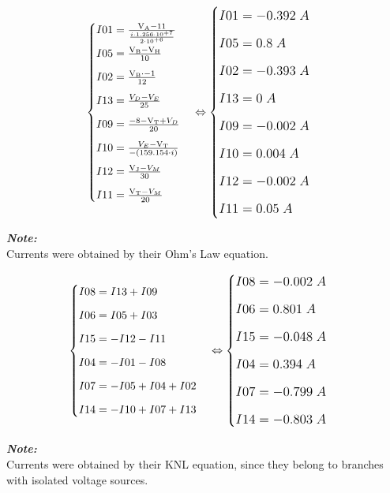 \documentclass[a4paper]{article}
\begin{document}
\begin{gather*}
\begin{cases}I01 = \frac{\mathrm{V_{A}}-11}{\frac{ i\cdot1.256\cdot10^{+7}}{2\cdot10^{+6}}} \\[0.7em] I05 = \frac{\mathrm{V_{B}}-\mathrm{V_{H}}}{10} \\[0.7em] I02 = \frac{\mathrm{V_{B}}\cdot-1}{12} \\[0.7em] I13 = \frac{ V_{D}- V_{E}}{25} \\[0.7em] I09 = \frac{-8-\mathrm{V_{T}}+ V_{D}}{20} \\[0.7em] I10 = \frac{ V_{E}-\mathrm{V_{T}}}{-\left(159.154\cdot i\right)} \\[0.7em] I12 = \frac{\mathrm{V_{J}}- V_{M}}{30} \\[0.7em] I11 = \frac{\mathrm{V_{T}}- V_{M}}{20}\end{cases} \Leftrightarrow\large \begin{cases}I01 = -0.392\;A \\[0.7em] I05 = 0.8\;A \\[0.7em] I02 = -0.393\;A \\[0.7em] I13 = 0\;A \\[0.7em] I09 = -0.002\;A \\[0.7em] I10 = 0.004\;A \\[0.7em] I12 = -0.002\;A \\[0.7em] I11 = 0.05\;A\end{cases}
\end{gather*}
\begin{footnotesize}
\textbf{\textit{Note:}} \\
 Currents were obtained by their Ohm's Law equation.
\end{footnotesize}

\begin{gather*}
\begin{cases}I08 = I13 + I09 \\[0.7em] I06 = I05 + I03 \\[0.7em] I15 = -I12 - I11 \\[0.7em] I04 = -I01 - I08 \\[0.7em] I07 = -I05 + I04 + I02 \\[0.7em] I14 = -I10 + I07 + I13\end{cases} \Leftrightarrow\large \begin{cases}I08 = -0.002\;A \\[0.7em] I06 = 0.801\;A \\[0.7em] I15 = -0.048\;A \\[0.7em] I04 = 0.394\;A \\[0.7em] I07 = -0.799\;A \\[0.7em] I14 = -0.803\;A\end{cases}
\end{gather*}
\begin{footnotesize}
\textbf{\textit{Note:}} \\
 Currents were obtained by their KNL equation, since they belong to branches with isolated voltage sources.
\end{footnotesize}
\end{document}
